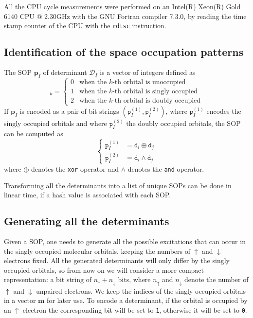 \documentclass[aip,jcp,reprint,showkeys]{revtex4-1}
\newcommand{\md}{\mathtt{d}}
\newcommand{\mD}{\mathcal{D}}
\newcommand{\mpp}{\mathtt{p}}
\newcommand{\mpv}{\mathbf{p}}
\newcommand{\up}{\uparrow}
\newcommand{\dn}{\downarrow}
\newcommand{\sop}{SOP}
\newcommand{\one}{{\texttt{1}}}
\newcommand{\zero}{{\texttt{0}}}
\begin{document}
All the CPU cycle measurements were performed  on an Intel(R) Xeon(R)
Gold 6140 CPU @ 2.30GHz with the GNU Fortran compiler 7.3.0, by reading
the time stamp counter of the CPU with the \texttt{rdtsc} instruction.


\subsection{Identification of the space occupation patterns}

The {\sop} $\mpv_I$ of determinant $\mD_I$ 
is a vector of integers defined as
\begin{equation}
  [\mpv_I]_k = 
  \begin{cases} 
    0 & \text{when the $k$-th orbital is unoccupied} \\
    1 & \text{when the $k$-th orbital is singly occupied} \\
    2 & \text{when the $k$-th orbital is doubly occupied}
  \end{cases} 
\end{equation}
If $\mpv_I$ is encoded as a pair of bit strings $(\mpp_I^{(1)}, \mpp_I^{(2)})$, where
$\mpp_I^{(1)}$ encodes the singly occupied orbitals and where $\mpp_I^{(2)}$ the doubly
occupied orbitals, the {\sop} can be computed as
\begin{equation}
\label{eq:sop}
\begin{cases}
  \mpp_I^{(1)} & = \md_i \oplus \md_j \\
  \mpp_I^{(2)} & = \md_i \wedge \md_j 
  \end{cases} 
\end{equation}
where $\oplus$ denotes the \texttt{xor} operator and $\wedge$ denotes the
\texttt{and} operator.

Transforming all the determinants into a list of unique \sop s can be done
in linear time, if a hash value is associated with each \sop .\cite{Bitton_1983}

\subsection{Generating all the determinants}


Given a {\sop}, one needs to generate all the possible excitations that can
occur in the singly occupied molecular orbitals, keeping the numbers of $\up$
and $\dn$ electrons fixed.
All the generated determinants will only differ by the singly occupied orbitals,
so from now on we will consider a more compact representation: a bit string of
$n_\up + n_\dn$ bits, where $n_\up$ and $n_\dn$ denote the number of $\up$ and
$\dn$ unpaired electrons. We keep the indices of the singly occupied orbitals
in a vector $\mathbf{m}$ for later use.
To encode a determinant, if the orbital is occupied by an $\up$ electron the
corresponding bit will be set to \one{}, otherwise it will be set to \zero{}.
\end{document}
